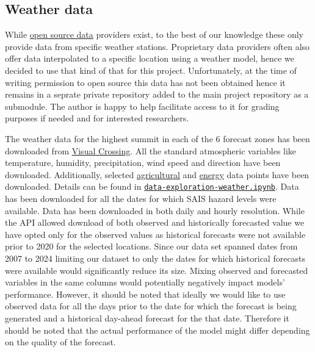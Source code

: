 \documentclass{article}
\begin{document}
\subsection{Weather data}
While \href{https://meteostat.net}{open source data} providers exist, to the best of our knowledge these only provide data from specific weather stations. Proprietary data providers often also offer data interpolated to a specific location using a weather model, hence we decided to use that kind of that for this project. Unfortunately, at the time of writing permission to open source this data has not been obtained hence it remains in a seprate private repository added to the main project repository as a submodule. The author is happy to help facilitate access to it for grading purposes if needed and for interested researchers.

The weather data for the highest summit in each of the 6 forecast zones has been downloaded from \href{https://www.visualcrossing.com/}{Visual Crossing}.  All the standard atmospheric variables like temperature, humidity, precipitation, wind speed and direction have been downloaded. Additionally, selected \href{https://www.visualcrossing.com/resources/documentation/weather-api/agriculture-elements-in-the-timeline-weather-api/}{agricultural} and \href{https://www.visualcrossing.com/resources/documentation/weather-api/energy-elements-in-the-timeline-weather-api/}{energy} data points have been downloaded. Details can be found in \href{https://github.com/witgaw/avalanche-danger-level-forecast/blob/project-report/src/data-exploration-weather.ipynb}{\texttt{data-exploration-weather.ipynb}}.
	Data has been downloaded for all the dates for which SAIS hazard levels were available. Data has been downloaded in both daily and hourly resolution. 
	While the API allowed download of both observed and historically forecasted value we have opted only for the observed values as historical forecasts were not available prior to 2020 for the selected locations. Since our data set spanned dates from 2007 to 2024 limiting our dataset to only the dates for which historical forecasts were available would significantly reduce its size. Mixing observed and forecasted variables in the same columns would potentially negatively impact models' performance. However, it should be noted that ideally we would like to use observed data for all the days prior to the date for which the forecast is being generated and a historical day-ahead forecast for the that date. Therefore it should be noted that the actual performance of the model might differ depending on the quality of the forecast.
\end{document}
